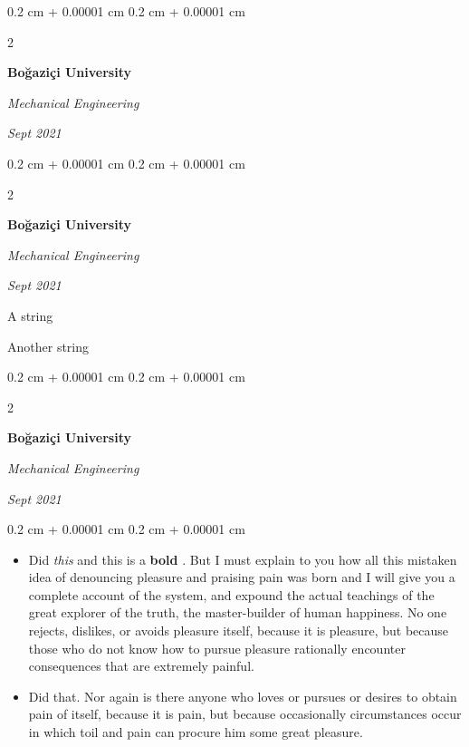 \documentclass[10pt, letterpaper]{article}
\newenvironment{summary}{
    \begin{description}[
        topsep=0.10 cm,
        parsep=0.10 cm,
        partopsep=0pt,
        itemsep=0pt,
        leftmargin=0.4 cm + 10pt
    ]
}{
    \end{description}
} %
\newenvironment{highlights}{
    \begin{itemize}[
        topsep=0.10 cm,
        parsep=0.10 cm,
        partopsep=0pt,
        itemsep=0pt,
        leftmargin=0.4 cm + 10pt
    ]
}{
    \end{itemize}
} %
\newenvironment{onecolentry}{
    \begin{adjustwidth}{
        0.2 cm + 0.00001 cm
    }{
        0.2 cm + 0.00001 cm
    }
}{
    \end{adjustwidth}
} %
\newenvironment{twocolentry}[2][]{
    \onecolentry
    \def\secondColumn{#2}
    \setcolumnwidth{\fill, 4.5 cm}
    \begin{paracol}{2}
}{
    \switchcolumn \raggedleft \secondColumn
    \end{paracol}
    \endonecolentry
} %
\let\hrefWithoutArrow\href
\renewcommand{\href}[2]{\hrefWithoutArrow{#1}{\ifthenelse{\equal{#2}{}}{ }{#2 }\raisebox{.15ex}{\footnotesize \faExternalLink*}}}
\begin{document}
        \begin{twocolentry}{
            
            
        \textit{Sept 2021}}
            \textbf{Boğaziçi University}

            \textit{Mechanical Engineering}
        \end{twocolentry}


        \vspace{0.2 cm}

        \begin{twocolentry}{
            
            
        \textit{Sept 2021}}
            \textbf{Boğaziçi University}

            \textit{Mechanical Engineering}
        \end{twocolentry}
            \begin{summary}
                \item A string
                \item Another string
            \end{summary}


        \vspace{0.2 cm}

        \begin{twocolentry}{
            
            
        \textit{Sept 2021}}
            \textbf{Boğaziçi University}

            \textit{Mechanical Engineering}
        \end{twocolentry}
        \vspace{0.10 cm}
        \begin{onecolentry}
            \begin{highlights}
                \item Did \textit{this} and this is a \textbf{bold} \href{https://example.com}{link}. But I must explain to you how all this mistaken idea of denouncing pleasure and praising pain was born and I will give you a complete account of the system, and expound the actual teachings of the great explorer of the truth, the master-builder of human happiness. No one rejects, dislikes, or avoids pleasure itself, because it is pleasure, but because those who do not know how to pursue pleasure rationally encounter consequences that are extremely painful.
                \item Did that. Nor again is there anyone who loves or pursues or desires to obtain pain of itself, because it is pain, but because occasionally circumstances occur in which toil and pain can procure him some great pleasure.
            \end{highlights}
        \end{onecolentry}
\end{document}
